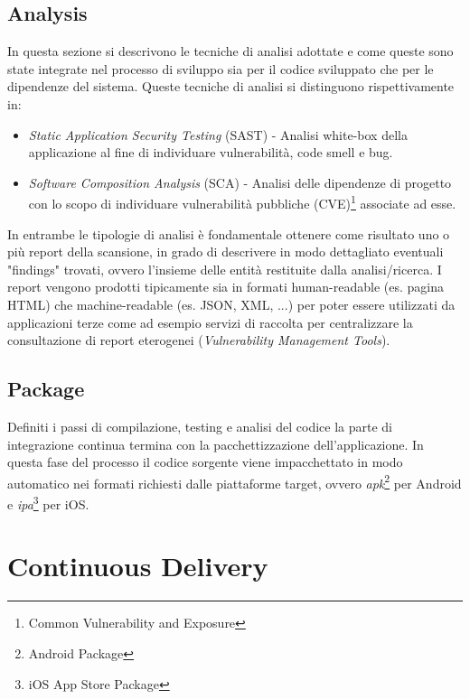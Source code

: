 \subsection{Analysis}
In questa sezione si descrivono le tecniche di analisi adottate e come queste sono state integrate nel processo di sviluppo sia per il codice sviluppato che per le dipendenze del sistema. Queste tecniche di analisi si distinguono rispettivamente in:
\begin{itemize}
    \item \textit{Static Application Security Testing} (SAST) - Analisi white-box della applicazione al fine di individuare vulnerabilità, code smell e bug.
    \item \textit{Software Composition Analysis} (SCA) - Analisi delle dipendenze di progetto con lo scopo di individuare vulnerabilità pubbliche (CVE)\footnote{Common Vulnerability and Exposure} associate ad esse.
\end{itemize}
In entrambe le tipologie di analisi è fondamentale ottenere come risultato uno o più report della scansione, in grado di descrivere in modo dettagliato eventuali "findings" trovati, ovvero l'insieme delle entità restituite dalla analisi/ricerca. I report vengono prodotti tipicamente sia in formati human-readable (es. pagina HTML) che machine-readable (es. JSON, XML, ...) per poter essere utilizzati da applicazioni terze come ad esempio servizi di raccolta per centralizzare la consultazione di report eterogenei (\textit{Vulnerability Management Tools}).


\subsection{Package}
Definiti i passi di compilazione, testing e analisi del codice la parte di integrazione continua termina con la pacchettizzazione dell'applicazione. In questa fase del processo il codice sorgente viene impacchettato in modo automatico nei formati richiesti dalle piattaforme target, ovvero \textit{apk}\footnote{Android Package} per Android e \textit{ipa}\footnote{iOS App Store Package} per iOS.

\section{Continuous Delivery}


